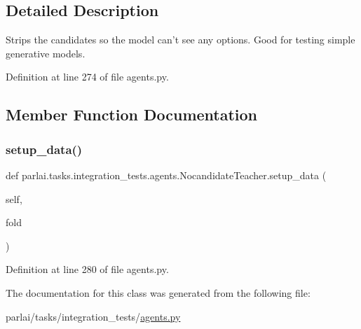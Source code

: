 \subsection{Detailed Description}
\begin{DoxyVerb}Strips the candidates so the model can't see any options. Good for testing
simple generative models.
\end{DoxyVerb}
 

Definition at line 274 of file agents.\+py.



\subsection{Member Function Documentation}
\mbox{\label{classparlai_1_1tasks_1_1integration__tests_1_1agents_1_1NocandidateTeacher_a0cf2accf985db966f44f77a7328fcff2}} 
\subsubsection{\texorpdfstring{setup\+\_\+data()}{setup\_data()}}
{\footnotesize\ttfamily def parlai.\+tasks.\+integration\+\_\+tests.\+agents.\+Nocandidate\+Teacher.\+setup\+\_\+data (\begin{DoxyParamCaption}\item[{}]{self,  }\item[{}]{fold }\end{DoxyParamCaption})}



Definition at line 280 of file agents.\+py.



The documentation for this class was generated from the following file\+:\begin{DoxyCompactItemize}
\item 
parlai/tasks/integration\+\_\+tests/\hyperlink{parlai_2tasks_2integration__tests_2agents_8py}{agents.\+py}\end{DoxyCompactItemize}
